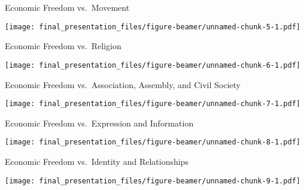 \documentclass[ignorenonframetext,]{beamer}
\begin{document}
\begin{frame}{Economic Freedom vs.~Movement}
\protect\hypertarget{economic-freedom-vs.movement}{}

\texttt{[image: final\_presentation\_files/figure-beamer/unnamed-chunk-5-1.pdf]}

\end{frame}

\begin{frame}{Economic Freedom vs.~Religion}
\protect\hypertarget{economic-freedom-vs.religion}{}

\texttt{[image: final\_presentation\_files/figure-beamer/unnamed-chunk-6-1.pdf]}

\end{frame}

\begin{frame}{Economic Freedom vs.~Association, Assembly, and Civil
Society}
\protect\hypertarget{economic-freedom-vs.association-assembly-and-civil-society}{}

\texttt{[image: final\_presentation\_files/figure-beamer/unnamed-chunk-7-1.pdf]}

\end{frame}

\begin{frame}{Economic Freedom vs.~Expression and Information}
\protect\hypertarget{economic-freedom-vs.expression-and-information}{}

\texttt{[image: final\_presentation\_files/figure-beamer/unnamed-chunk-8-1.pdf]}

\end{frame}

\begin{frame}{Economic Freedom vs.~Identity and Relationships}
\protect\hypertarget{economic-freedom-vs.identity-and-relationships}{}

\texttt{[image: final\_presentation\_files/figure-beamer/unnamed-chunk-9-1.pdf]}

\end{frame}
\end{document}
